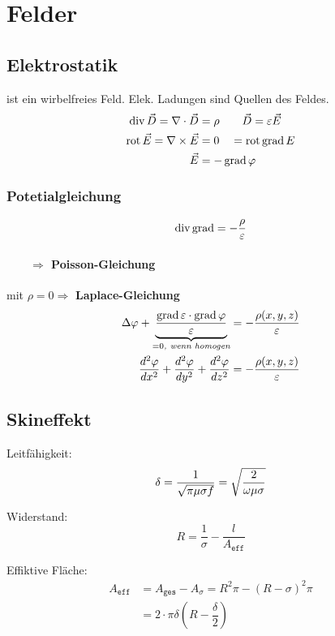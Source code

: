 \section{Felder}

\subsection{Elektrostatik}
ist ein wirbelfreies Feld. Elek. Ladungen sind Quellen des Feldes.
\begin{align*}
    \operatorname{div} \vec{D} = \nabla \cdot \vec{D}  &= \rho       \qquad          \vec{D} = \varepsilon \vec{E}\\
    \operatorname{rot} \vec{E} = \nabla \times \vec{E} &= 0 \quad = \operatorname{rot} \operatorname{grad} E\\
    \vec{E} &=- \operatorname{grad} \varphi
\end{align*}
\subsubsection{Potetialgleichung}
\[
    \operatorname{div} \operatorname{grad} = - \dfrac{\rho}{\varepsilon}
\]
\paragraph{$\qquad \Rightarrow$ Poisson-Gleichung}
mit $\rho = 0 \Rightarrow$ \textbf{Laplace-Gleichung}
\begin{align*}
    \Delta \varphi + \underbrace{ \dfrac{\operatorname{grad} \varepsilon \cdot \operatorname{grad} \varphi}{\varepsilon}}_{= 0\textit{, wenn homogen}}       
                                &= - \dfrac{\rho (x, y, z)}{\varepsilon}\\
    \frac{d^2 \varphi}{d x^2} + \frac{d^2 \varphi}{d y^2} + \frac{d^2 \varphi}{d z^2}
                                &= - \dfrac{\rho (x, y, z)}{\varepsilon}
\end{align*}
\subsection{Skineffekt}

\begin{description}
    \item Leitfähigkeit:
          \[
              \delta = \frac{1}{\sqrt{\pi\mu\sigma f}} = \sqrt{\frac{2}{\omega\mu\sigma}} \\
          \]

    \item Widerstand:
          \[
              R = \frac{1}{\sigma} - \frac{l}{A_{\texttt{eff}}}
          \]

    \item Effiktive Fläche:
          \begin{align*}
              A_{\texttt{eff}} & = A_{\texttt{ges}} - A_{\sigma} = R^2\pi-(R-\sigma)^2\pi \\
                               & =2\cdot \pi \delta \left( R-\dfrac{\delta }{2}\right)
          \end{align*}
\end{description}

